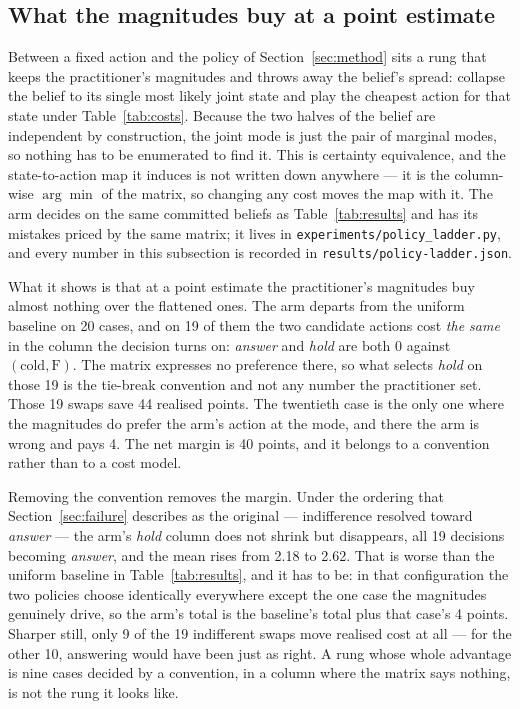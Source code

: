 \documentclass{article}
\begin{document}
\subsection{What the magnitudes buy at a point estimate}
\label{sec:plugin}
Between a fixed action and the policy of Section~\ref{sec:method} sits a rung that
keeps the practitioner's magnitudes and throws away the belief's spread: collapse the
belief to its single most likely joint state and play the cheapest action for that
state under Table~\ref{tab:costs}. Because the two halves of the belief are
independent by construction, the joint mode is just the pair of marginal modes, so
nothing has to be enumerated to find it. This is certainty equivalence, and the
state-to-action map it induces is not written down anywhere --- it is the column-wise
$\arg\min$ of the matrix, so changing any cost moves the map with it. The arm decides
on the same committed beliefs as Table~\ref{tab:results} and has its mistakes priced
by the same matrix; it lives in \texttt{experiments/policy\_ladder.py}, and every
number in this subsection is recorded in \texttt{results/policy-ladder.json}.

What it shows is that at a point estimate the practitioner's magnitudes buy almost
nothing over the flattened ones. The arm departs from the uniform baseline on 20
cases, and on 19 of them the two candidate actions cost \emph{the same} in the column
the decision turns on: \emph{answer} and \emph{hold} are both 0 against
$(\text{cold}, \text{F})$. The matrix expresses no preference there, so what selects
\emph{hold} on those 19 is the tie-break convention and not any number the
practitioner set. Those 19 swaps save 44 realised points. The twentieth case is the
only one where the magnitudes do prefer the arm's action at the mode, and there the
arm is wrong and pays 4. The net margin is 40 points, and it belongs to a convention
rather than to a cost model.

Removing the convention removes the margin. Under the ordering that
Section~\ref{sec:failure} describes as the original --- indifference resolved toward
\emph{answer} --- the arm's \emph{hold} column does not shrink but disappears, all 19
decisions becoming \emph{answer}, and the mean rises from 2.18 to 2.62. That is worse
than the uniform baseline in Table~\ref{tab:results}, and it has to be: in that
configuration the two policies choose identically everywhere except the one case the
magnitudes genuinely drive, so the arm's total is the baseline's total plus that
case's 4 points. Sharper still, only 9 of the 19 indifferent swaps move realised cost
at all --- for the other 10, answering would have been just as right. A rung whose
whole advantage is nine cases decided by a convention, in a column where the matrix
says nothing, is not the rung it looks like.
\end{document}
